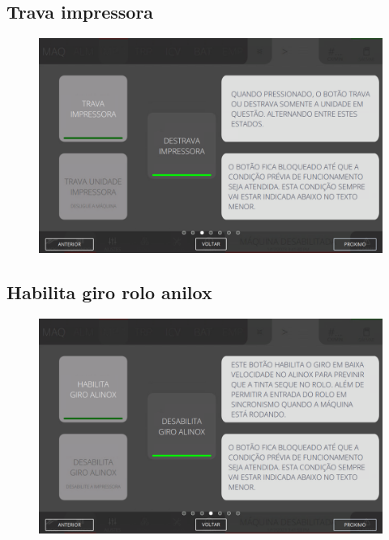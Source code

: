 \newpage
\thispagestyle{fancy}
\vspace{\fill}
\subsection{Trava impressora}
\begin{figure}
    \centering
    \includegraphics[width=576 px,height=360 px]{src/imagesICV/04-printters/02-printter/commands/3.png}
\end{figure}

\newpage
\thispagestyle{fancy}
\vspace{\fill}
\subsection{Habilita giro rolo anilox}
\begin{figure}
    \centering
    \includegraphics[width=576 px,height=360 px]{src/imagesICV/04-printters/02-printter/commands/4.png}
\end{figure}


